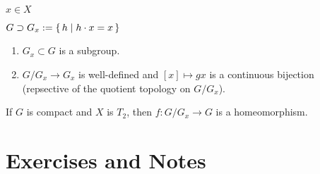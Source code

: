 \begin{defbox}
    \begin{definition}[Stabilisator]
        \(x \in X\)

        \(G \supset G_x := \left\{\, h \mid h \cdot x = x \,\right\}\)
    \end{definition}
\end{defbox}

\begin{thmbox}
    \begin{lemma}
        \begin{enumerate}
            \item \(G_x \subset G\) is a subgroup.
            \item \(G/G_x \longrightarrow G_x\) is well-defined and \([x] \mapsto gx\) is a continuous bijection (repsective of the quotient topology on \(G / G_x\)).
        \end{enumerate}
    \end{lemma}
\end{thmbox}

\begin{thmbox}
    \begin{corollary}
        If \(G\) is compact and \(X\) is \(T_2\), then \(f: G/G_x \longrightarrow G\) is a homeomorphism.
    \end{corollary}
\end{thmbox}

\begin{defbox}
    \begin{definition}
        
    \end{definition}
\end{defbox}

\newpage
\section{Exercises and Notes}